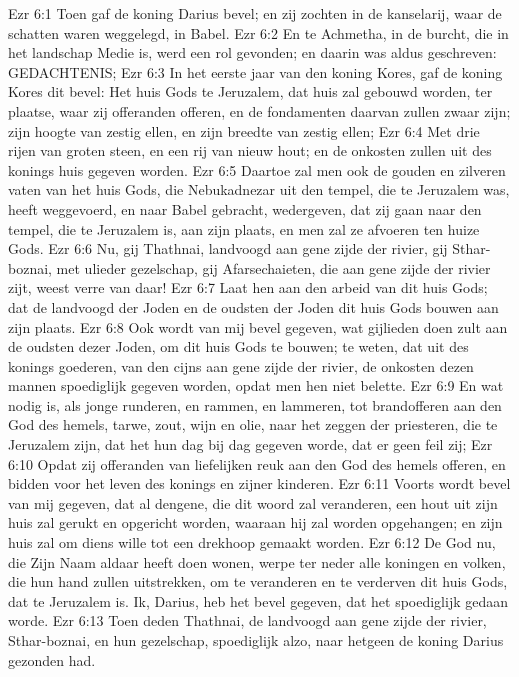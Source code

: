 Ezr 6:1  Toen gaf de koning Darius bevel; en zij zochten in de kanselarij, waar de schatten waren weggelegd, in Babel.
Ezr 6:2  En te Achmetha, in de burcht, die in het landschap Medie is, werd een rol gevonden; en daarin was aldus geschreven: GEDACHTENIS;
Ezr 6:3  In het eerste jaar van den koning Kores, gaf de koning Kores dit bevel: Het huis Gods te Jeruzalem, dat huis zal gebouwd worden, ter plaatse, waar zij offeranden offeren, en de fondamenten daarvan zullen zwaar zijn; zijn hoogte van zestig ellen, en zijn breedte van zestig ellen;
Ezr 6:4  Met drie rijen van groten steen, en een rij van nieuw hout; en de onkosten zullen uit des konings huis gegeven worden.
Ezr 6:5  Daartoe zal men ook de gouden en zilveren vaten van het huis Gods, die Nebukadnezar uit den tempel, die te Jeruzalem was, heeft weggevoerd, en naar Babel gebracht, wedergeven, dat zij gaan naar den tempel, die te Jeruzalem is, aan zijn plaats, en men zal ze afvoeren ten huize Gods.
Ezr 6:6  Nu, gij Thathnai, landvoogd aan gene zijde der rivier, gij Sthar-boznai, met ulieder gezelschap, gij Afarsechaieten, die aan gene zijde der rivier zijt, weest verre van daar!
Ezr 6:7  Laat hen aan den arbeid van dit huis Gods; dat de landvoogd der Joden en de oudsten der Joden dit huis Gods bouwen aan zijn plaats.
Ezr 6:8  Ook wordt van mij bevel gegeven, wat gijlieden doen zult aan de oudsten dezer Joden, om dit huis Gods te bouwen; te weten, dat uit des konings goederen, van den cijns aan gene zijde der rivier, de onkosten dezen mannen spoediglijk gegeven worden, opdat men hen niet belette.
Ezr 6:9  En wat nodig is, als jonge runderen, en rammen, en lammeren, tot brandofferen aan den God des hemels, tarwe, zout, wijn en olie, naar het zeggen der priesteren, die te Jeruzalem zijn, dat het hun dag bij dag gegeven worde, dat er geen feil zij;
Ezr 6:10  Opdat zij offeranden van liefelijken reuk aan den God des hemels offeren, en bidden voor het leven des konings en zijner kinderen.
Ezr 6:11  Voorts wordt bevel van mij gegeven, dat al dengene, die dit woord zal veranderen, een hout uit zijn huis zal gerukt en opgericht worden, waaraan hij zal worden opgehangen; en zijn huis zal om diens wille tot een drekhoop gemaakt worden.
Ezr 6:12  De God nu, die Zijn Naam aldaar heeft doen wonen, werpe ter neder alle koningen en volken, die hun hand zullen uitstrekken, om te veranderen en te verderven dit huis Gods, dat te Jeruzalem is. Ik, Darius, heb het bevel gegeven, dat het spoediglijk gedaan worde.
Ezr 6:13  Toen deden Thathnai, de landvoogd aan gene zijde der rivier, Sthar-boznai, en hun gezelschap, spoediglijk alzo, naar hetgeen de koning Darius gezonden had.
